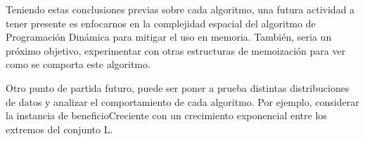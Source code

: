 \documentclass[10pt,a4paper]{article}
\begin{document}
Teniendo estas conclusiones previas sobre cada algoritmo, una futura actividad a tener presente es enfocarnos en la complejidad espacial del algoritmo de Programación Dinámica para mitigar el uso en memoria. También, seria un próximo objetivo, experimentar con otras estructuras de memoización para ver como se comporta este algoritmo.

Otro punto de partida futuro, puede ser poner a prueba distintas distribuciones de datos y analizar el comportamiento de cada algoritmo. Por ejemplo, considerar la instancia de beneficioCreciente con un crecimiento exponencial entre los extremos del conjunto L. 
\end{document}
